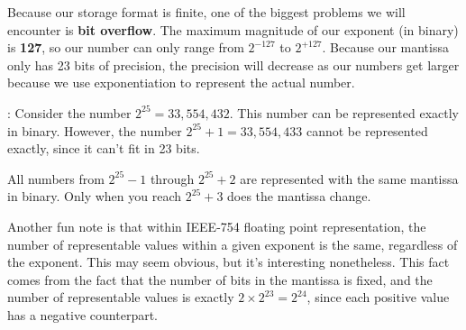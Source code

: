 Because our storage format is finite, one of the biggest problems we will 
encounter is \textbf{bit overflow}. The maximum magnitude of our exponent 
(in binary) is \textbf{127}, so our number can only range from $2^{-127}$ to
$2^{+127}$. Because our mantissa only has 23 bits of precision, the precision
will decrease as our numbers get larger because we use exponentiation to 
represent the actual number.

\Ex:
Consider the number $2^{25} = 33,554,432$. This number can be represented 
exactly in binary. However, the number $2^{25}+1 = 33,554,433$ cannot be
represented exactly, since it can't fit in 23 bits.

All numbers from $2^{25}-1$ through $2^{25}+2$ are represented with the same
mantissa in binary. Only when you reach $2^{25}+3$ does the mantissa change.

Another fun note is that within IEEE-754 floating point representation, the
number of representable values within a given exponent is the same, regardless
of the exponent. This may seem obvious, but it's interesting nonetheless. This
fact comes from the fact that the number of bits in the mantissa is fixed, and
the number of representable values is exactly $2\times 2^{23} = 2^{24}$, since each
positive value has a negative counterpart.

